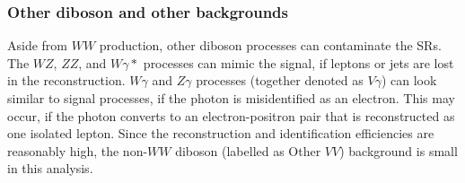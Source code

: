 

\subsubsection{Other diboson and other backgrounds}
Aside from $WW$ production, other diboson processes can contaminate the SRs. 
The $WZ$, $ZZ$, and $W\gamma*$ processes can mimic the signal, if leptons or jets are lost in the reconstruction. 
$W\gamma$ and $Z\gamma$ processes (together denoted as $V\gamma$) can look similar to signal processes, if the photon is misidentified as an electron. 
This may occur, if the photon converts to an electron-positron pair that is reconstructed as one isolated lepton. 
Since the reconstruction and identification efficiencies are reasonably high, the non-$WW$ diboson (labelled as Other $VV$) background is small in this analysis.
